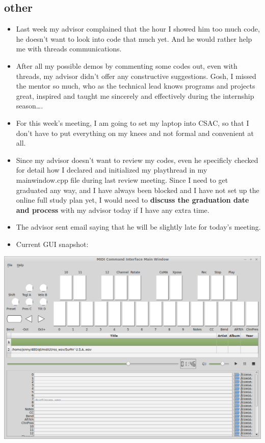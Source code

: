\documentclass[9pt,b5paper]{article}
\begin{document}
\subsection{other}
\label{sec-2-2}
\begin{itemize}
\item Last week my advisor complained that the hour I showed him too much code, he doesn't want to look into code that much yet. And he would rather help me with threads communications.
\item After all my possible demos by commenting some codes out, even with threads, my advisor didn't offer any constructive suggestions. Gosh, I missed the mentor so much, who as the technical lead knows programs and projects great, inspired and taught me sincerely and effectively during the internship season\ldots{}.
\item For this week's meeting, I am going to set my laptop into CSAC, so that I don't have to put everything on my knees and not formal and convenient at all.
\item Since my advisor doesn't want to review my codes, even he specificly checked for detail how I declared and initialized my playthread in my mainwindow.cpp file during last review meeting. Since I need to get graduated any way, and I have always been blocked and I have not set up the online full study plan yet, I would need to \textbf{discuss the graduation date and process} with my advisor today if I have any extra time.
\item The advisor sent email saying that he will be slightly late for today's meeting.
\item Current GUI snapshot:
\end{itemize}

\includegraphics[width=.9\linewidth]{./pic/Screenshot_from_2015-03-08_13:31:00.png}
\end{document}
